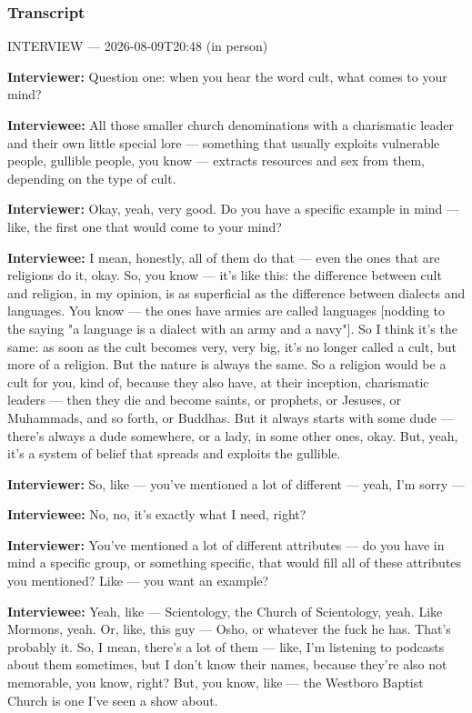 \subsubsection*{Transcript}
INTERVIEW — 2026-08-09T20:48 (in person)

\textbf{Interviewer:} Question one: when you hear the word cult, what comes to your mind?

\textbf{Interviewee:} All those smaller church denominations with a charismatic leader and their own little special lore — something that usually exploits vulnerable people, gullible people, you know — extracts resources and sex from them, depending on the type of cult.

\textbf{Interviewer:} Okay, yeah, very good. Do you have a specific example in mind — like, the first one that would come to your mind?

\textbf{Interviewee:} I mean, honestly, all of them do that — even the ones that are religions do it, okay. So, you know — it's like this: the difference between cult and religion, in my opinion, is as superficial as the difference between dialects and languages. You know — the ones  have armies are called languages [nodding to the saying "a language is a dialect with an army and a navy"]. So I think it's the same: as soon as the cult becomes very, very big, it's no longer called a cult, but more of a religion. But the nature is always the same. So a religion would be a cult for you, kind of, because they also have, at their inception, charismatic leaders — then they die and become saints, or prophets, or Jesuses, or Muhammads, and so forth, or Buddhas. But it always starts with some dude — there's always a dude somewhere, or a lady, in some other ones, okay. But, yeah, it's a system of belief that spreads and exploits the gullible.

\textbf{Interviewer:} So, like — you've mentioned a lot of different — yeah, I'm sorry —

\textbf{Interviewee:} No, no, it's exactly what I need, right?

\textbf{Interviewer:} You've mentioned a lot of different attributes — do you have in mind a specific group, or something specific, that would fill all of these attributes you mentioned? Like — you want an example?

\textbf{Interviewee:} Yeah, like — Scientology, the Church of Scientology, yeah. Like Mormons, yeah. Or, like, this guy — Osho, or whatever the fuck he has. That's probably it. So, I mean, there's a lot of them — like, I'm listening to podcasts about them sometimes, but I don't know their names, because they're also not memorable, you know, right? But, you know, like — the Westboro Baptist Church is one I've seen a show about.

